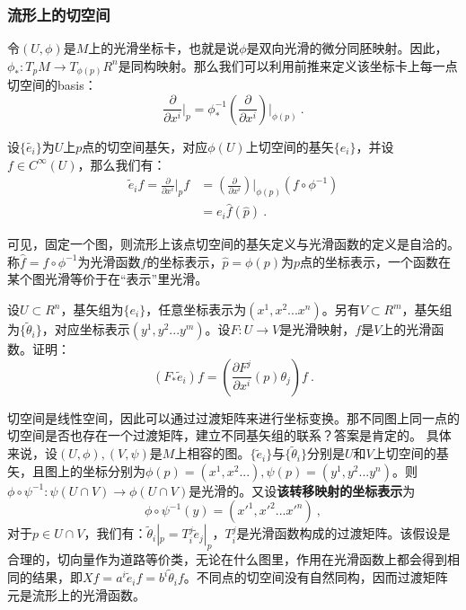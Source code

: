 \subsubsection{流形上的切空间}
令$(U,\phi)$是$M$上的光滑坐标卡，也就是说$\phi$是双向光滑的微分同胚映射。因此，$\phi_*:T_p M\rightarrow T_{\phi(p)}R^n$是同构映射。那么我们可以利用前推来定义该坐标卡上每一点切空间的basis：
\begin{equation}
\frac{\partial}{\partial x^i}\bigg|_p=\phi^{-1}_* (\frac{\partial}{\partial x^i})\bigg|_{\phi(p)}~.
\end{equation}

设$\{\widetilde{e_i}\}$为$U$上$p$点的切空间基矢，对应$\phi (U)$上切空间的基矢$\{{e_i}\}$，并设$f\in C^{\infty}(U)$，那么我们有：
\begin{equation}
\begin{aligned}
\widetilde e_i f=\frac{\partial}{\partial x^i}\bigg|_p f&= (\frac{\partial}{\partial x^i})\bigg|_{\phi(p)}(f\circ \phi^{-1})\\
&=e_i\hat f(\hat p)~.
\end{aligned}
\end{equation}

可见，固定一个图，则流形上该点切空间的基矢定义与光滑函数的定义是自洽的。称$\hat f=f\circ \phi^{-1}$为光滑函数$f$的坐标表示，$\hat p=\phi (p)$为$p$点的坐标表示，一个函数在某个图光滑等价于在“表示”里光滑。
\begin{exercise}{}
设$U\subset R^n$，基矢组为$\{e_i\}$，任意坐标表示为$(x^1,x^2...x^n)$。另有$V\subset R^m$，基矢组为$\{\widetilde \theta_i\}$，对应坐标表示$(y^1,y^2...y^m)$。设$F:U\rightarrow V$是光滑映射，$f$是$V$上的光滑函数。证明：
\begin{equation}
(F_*\widetilde e_i)f=(\frac{\partial F^j}{\partial x^i}(p)\theta_j)f~.
\end{equation}

\end{exercise}
切空间是线性空间，因此可以通过过渡矩阵来进行坐标变换。那不同图上同一点的切空间是否也存在一个过渡矩阵，建立不同基矢组的联系？答案是肯定的。
具体来说，设$(U,\phi),(V,\psi)$是$M$上相容的图。$\{\widetilde e_i\}$与$\{\widetilde \theta_i\}$分别是$U$和$V$上切空间的基矢，且图上的坐标分别为$\phi(p)=(x^1,x^2...),\psi(p)=(y^1,y^2...y^n)$。则$\phi\circ\psi^{-1}:\psi(U\cap V)\rightarrow\phi(U\cap V)$是光滑的。又设\textbf{该转移映射的坐标表示}为
\begin{equation}
\phi\circ \psi^{-1}(y)=(x'^1,x'^2...x'^n)~,
\end{equation}
对于$p\in U\cap V$，我们有：$\widetilde\theta_i|_p=T^j_i \widetilde e_j|_p$，$T^j_i$是光滑函数构成的过渡矩阵。该假设是合理的，切向量作为道路等价类，无论在什么图里，作用在光滑函数上都会得到相同的结果，即$Xf=a^i\widetilde e_if=b^i\widetilde \theta_i f$。不同点的切空间没有自然同构，因而过渡矩阵元是流形上的光滑函数。

